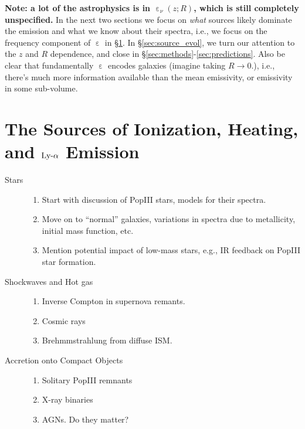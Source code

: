 \documentclass[letterpaper,titlepage,12pt]{article}
\begin{document}
{\bf Note: a lot of the astrophysics is in $\upepsilon_{\nu}(z; R)$, which is still completely unspecified.} In the next two sections we focus on \textit{what} sources likely dominate the emission and what we know about their spectra, i.e., we focus on the frequency component of $\upepsilon$ in \S\ref{sec:source_spectra}. In \S\ref{sec:source_evol}, we turn our attention to the $z$ and $R$ dependence, and close in \S\ref{sec:methods}-\ref{sec:predictions}. Also be clear that fundamentally $\upepsilon$ encodes galaxies (imagine taking $R\rightarrow 0$.), i.e., there's much more information available than the mean emissivity, or emissivity in some sub-volume.

\section{The Sources of Ionization, Heating, and $\text{Ly-}\alpha$ Emission} \label{sec:source_spectra}  \vspace{-12pt}

\begin{description}
  \item[Stars] \hfill
  \begin{enumerate}
      \item Start with discussion of PopIII stars, models for their spectra.
      \item Move on to ``normal'' galaxies, variations in spectra due to metallicity, initial mass function, etc.
      \item Mention potential impact of low-mass stars, e.g., IR feedback on PopIII star formation. 
  \end{enumerate}

  \item[Shockwaves and Hot gas] \hfill
  \begin{enumerate}
      \item Inverse Compton in supernova remants.
      \item Cosmic rays
      \item Brehmmstrahlung from diffuse ISM.
  \end{enumerate}
  
  \item[Accretion onto Compact Objects] \hfill
  \begin{enumerate}
      \item Solitary PopIII remnants
      \item X-ray binaries
      \item AGNs. Do they matter?
  \end{enumerate}
  
\end{description}
\end{document}
